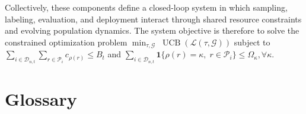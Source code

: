 \documentclass[12pt]{article}
\begin{document}
Collectively, these components define a closed-loop system in which sampling, labeling, evaluation, and deployment interact through shared resource constraints and evolving population dynamics. The system objective is therefore to solve the constrained optimization problem $\min_{\tau, \mathcal{G}} \; \operatorname{UCB}\!\left(\mathcal{L}(\tau,\mathcal{G}) \right)$ subject to $\sum_{i \in \mathcal{D}_{n,t}} \sum_{r \in \mathcal{P}_i} c_{\rho(r)} \le B_t$ and $\sum_{i \in \mathcal{D}_{n,t}} \mathbf{1}\{\rho(r)=\kappa,\; r \in \mathcal{P}_i\} \le \Omega_\kappa,  \forall \kappa $.

\newpage
\section{Glossary}

\renewcommand{\arraystretch}{0.95}
\setlength{\tabcolsep}{4pt}
\end{document}
